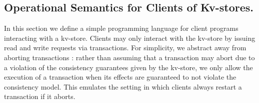 \subsection{Operational Semantics for Clients of Kv-stores.}
In this section we define a simple programming language for client programs interacting with a kv-store. Clients may only interact with the kv-store by 
issuing read and write requests via transactions. 
For simplicity, we abstract away from aborting transactions
: rather than assuming that a transaction may abort due to a violation of the consistency guarantees given by the kv-store, we only allow the execution of a transaction when its effects are guaranteed to not violate the consistency model. This emulates the setting in which clients always restart a transaction if it aborts.

